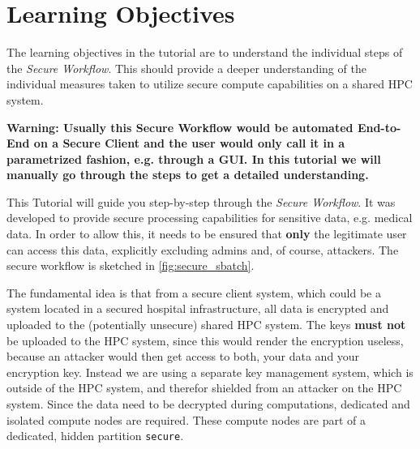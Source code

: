 \documentclass[paper=a4]{scrartcl}
\newcommand{\theexercisenumber}{1} %
\newcommand{\thedate}{\today} %
\begin{document}
\date{\thedate}
\exercise{\theexercisenumber}

\parskip 8pt
\makesheetheader

\section*{Learning Objectives}
The learning objectives in the tutorial are to understand the individual steps of the \textit{Secure Workflow}. This should provide a deeper understanding of the individual measures taken to utilize secure compute capabilities on a shared HPC system. 

\textbf{Warning: Usually this Secure Workflow would be automated End-to-End on a Secure Client and the user would only call it in a parametrized fashion, e.g. through a GUI. In this tutorial we will manually go through the steps to get a detailed understanding.}



\tableofcontents

\bigskip

This Tutorial will guide you step-by-step through the \textit{Secure Workflow}. 
It was developed to provide secure processing capabilities for sensitive data, e.g. medical data.
In order to allow this, it needs to be ensured that \textbf{only} the legitimate user can access this data, explicitly excluding admins and, of course, attackers. 
The secure workflow is sketched in \cref{fig:secure_sbatch}. 

The fundamental idea is that from a secure client system, which could be a system located in a secured hospital infrastructure, all data is encrypted and uploaded to the (potentially unsecure) shared HPC system.
The keys \textbf{must not} be uploaded to the HPC system, since this would render the encryption useless, because an attacker would then get access to both, your data and your encryption key. 
Instead we are using a separate key management system, which is outside of the HPC system, and therefor shielded from an attacker on the HPC system.
Since the data need to be decrypted during computations, dedicated and isolated compute nodes are required. 
These compute nodes are part of a dedicated, hidden partition \texttt{secure}. 
\end{document}
